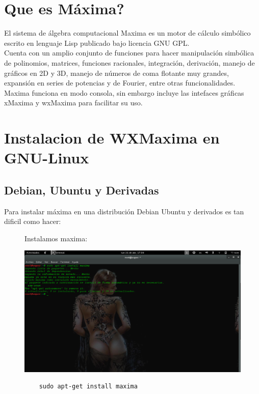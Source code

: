 \documentclass[10pt,a4paper]{book}
\begin{document}
\section{Que es Máxima?}
\begin{small}
El sistema de álgebra computacional Maxima es un motor de cálculo simbólico escrito en lenguaje Lisp publicado bajo licencia GNU GPL.\\
Cuenta con un amplio conjunto de funciones para hacer manipulación simbólica de polinomios, matrices, funciones racionales, integración, derivación, manejo de gráficos en 2D y 3D, manejo de números de coma flotante muy grandes, expansión en series de potencias y de Fourier, entre otras funcionalidades.\\
Maxima funciona en modo consola, sin embargo incluye las intefaces gráficas xMaxima y wxMaxima para facilitar su uso.\\
\section{Instalacion de WXMaxima en GNU-Linux}
\subsection{Debian, Ubuntu y Derivadas}
Para instalar máxima en una distribución Debian Ubuntu y derivados es tan dificil como hacer:\\
\begin{enumerate}

\begin{figure}[htb]
\item Instalamos maxima:\\
\begin{center}
\includegraphics[width=13cm]{fotos/cap2}
\begin{lstlisting}
	sudo apt-get install maxima
\end{lstlisting}
\end{center}
\end{figure}



\end{enumerate}
\end{small}
\end{document}
